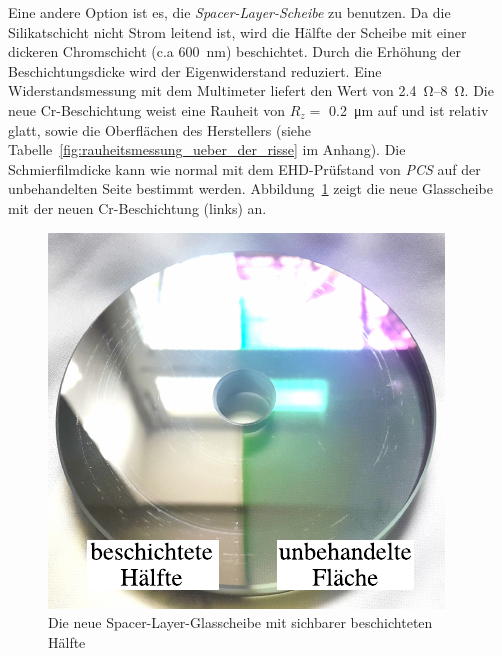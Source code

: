 Eine andere Option ist es, die \textit{Spacer-Layer-Scheibe} zu benutzen.
Da die Silikatschicht nicht Strom leitend ist, wird die Hälfte der Scheibe mit einer dickeren Chromschicht (c.a \SI{600}{\nano\meter}) beschichtet.
Durch die Erhöhung der Beschichtungsdicke wird der Eigenwiderstand reduziert.
Eine Widerstandsmessung mit dem Multimeter liefert den Wert von \SIrange{2.4}{8}{\ohm}.
Die neue Cr-Beschichtung weist eine Rauheit von $R_z =$ \SI{0.2}{\um}  auf und ist relativ glatt, sowie die Oberflächen des Herstellers (siehe Tabelle~\ref{fig:rauheitsmessung_ueber_der_risse} im Anhang).
Die Schmierfilmdicke kann wie normal mit dem EHD-Prüfstand von \textit{PCS} auf der unbehandelten Seite bestimmt werden.
Abbildung~\ref{fig:die_neu_beschichtet_glassscheibe} zeigt die neue Glasscheibe mit der neuen Cr-Beschichtung (links) an.

\begin{figure}[htb]
    \centering
    \includegraphics[]{./images/beschichtete_scheibe.pdf}
    \caption{Die neue Spacer-Layer-Glasscheibe mit sichbarer beschichteten Hälfte}
    \label{fig:die_neu_beschichtet_glassscheibe}
\end{figure}

